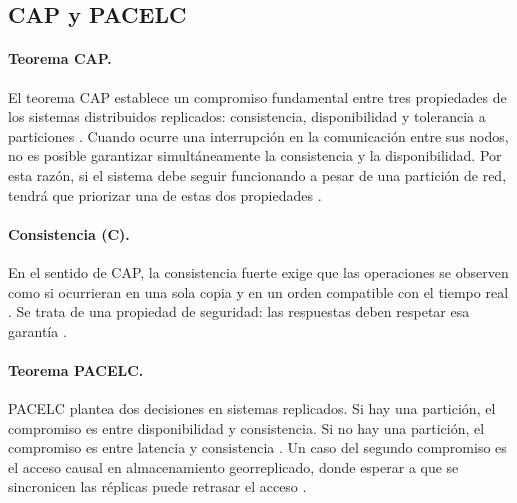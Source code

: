 
\subsection*{CAP y PACELC}

\paragraph{Teorema CAP.}
El teorema CAP establece un compromiso fundamental entre tres propiedades de
los sistemas distribuidos replicados: consistencia, disponibilidad y
tolerancia a particiones \cite[p.~172]{ahmed2023consistency}. Cuando ocurre
una interrupción en la comunicación entre sus nodos, no es posible garantizar
simultáneamente la consistencia y la disponibilidad. Por esta razón, si el
sistema debe seguir funcionando a pesar de una partición de red, tendrá que
priorizar una de estas dos propiedades \cite[p.~2]{lee2023consistency}.

\paragraph{Consistencia (C).}
En el sentido de CAP, la consistencia fuerte exige que las operaciones se
observen como si ocurrieran en una sola copia y en un orden compatible con
el tiempo real \cite[Sec.~2]{gilbert2012perspectives}. Se trata de una
propiedad de seguridad: las respuestas deben respetar esa garantía
\cite[Sec.~1]{gilbert2012perspectives}.

\paragraph{Teorema PACELC.}
PACELC plantea dos decisiones en sistemas replicados. Si hay una partición,
el compromiso es entre disponibilidad y consistencia. Si no hay una
partición, el compromiso es entre latencia y consistencia
\cite{ahmed2023consistency}. Un caso del segundo compromiso es el acceso
causal en almacenamiento georreplicado, donde esperar a que se sincronicen
las réplicas puede retrasar el acceso \cite{lima2023causal}.

